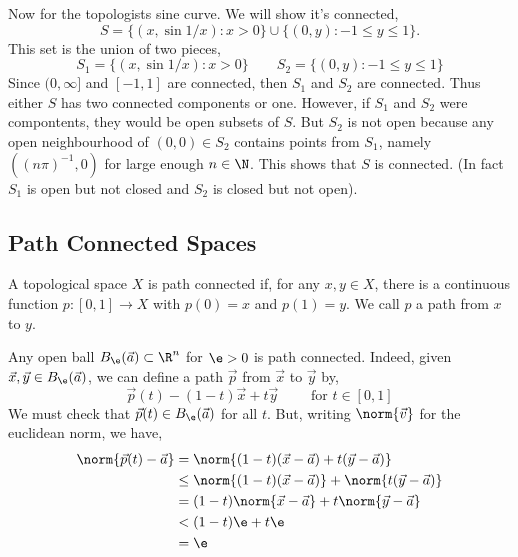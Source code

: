 \begin{eg}
  Now for the topologists sine curve. We will show it's connected,
  $$ S = \{(x, \sin 1/x) : x > 0\} \cup \{(0, y) : -1 \le y \le 1\}. $$
  This set is the union of two pieces,
  $$ S_1 = \{(x, \sin 1/x) : x > 0\} \qquad S_2 = \{(0, y) : -1 \le y \le 1\} $$
  Since $(0,\infty]$ and $[-1, 1]$ are connected, then $S_1$ and $S_2$ are connected. Thus either $S$ has two connected components or one. However, if $S_1$ and $S_2$ were compontents, they would be open subsets of $S$. But $S_2$ is not open because any open neighbourhood of $(0, 0) \in S_2$ contains points from $S_1$, namely $((n\pi)^{-1}, 0)$ for large enough $n \in \N$. This shows that $S$ is connected. (In fact $S_1$ is open but not closed and $S_2$ is closed but not open).
\end{eg}

\subsection{Path Connected Spaces}
\begin{ndefi}
  A topological space $X$ is path connected if, for any $x, y \in X$, there is a continuous function $p : [0, 1] \to X$ with $p(0) = x$ and $p(1) = y$. We call $p$ a path from $x$ to $y$.
\end{ndefi}

\begin{eg}
  Any open ball $B_\e(\vec a) \subset \R^n$ for $\e > 0$ is path connected. Indeed, given $\vec x, \vec y \in B_\e(\vec a)$, we can define a path $\vec p$ from $\vec x$ to $\vec y$ by,
  $$ \vec p(t) - (1 - t)\vec x + t\vec y \qquad \text{ for } t\in [0, 1] $$
  We must check that $\vec p (t) \in B_\e(\vec a)$ for all $t$. But, writing $\norm{\vec v}$ for the euclidean norm, we have,
  \begin{align*}
    \norm{\vec p(t) - \vec a} &= \norm{(1 - t)(\vec x - \vec a) + t(\vec y - \vec a)} \\
    &\le \norm{(1 - t)(\vec x - \vec a)} + \norm{t(\vec y - \vec a)} \\
    &= (1 - t)\norm{\vec x - \vec a} + t\norm{\vec y - \vec a}\\
    &< (1 - t)\e + t\e \\
    &= \e
  \end{align*}
\end{eg}

